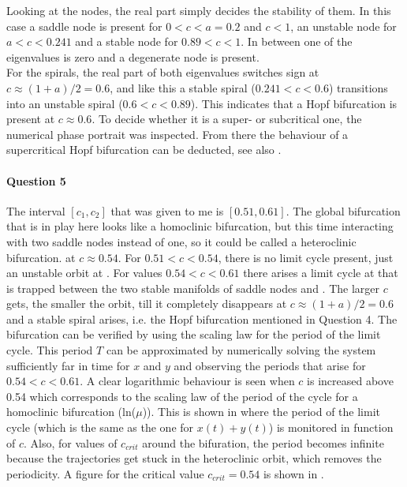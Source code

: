 \documentclass[a4paper,11pt]{article}
\begin{document}
Looking at the nodes, the real part simply decides the stability of them. In this case a saddle node is present for $0<c<a=0.2$ and $c<1$, an unstable node for 
$a<c<0.241$ and a stable node for $0.89<c<1$. In between one of the eigenvalues is zero and a degenerate node is present.\\
For the spirals, the real part of both eigenvalues switches sign at $c\approx(1+a)/2=0.6$, and like this a stable spiral ($0.241<c<0.6$) transitions into an 
unstable spiral ($0.6<c<0.89$). 
This indicates that a Hopf bifurcation is present at $c\approx0.6$. To decide whether it is a super- or subcritical one, 
the numerical phase portrait was inspected. From there the behaviour of a supercritical Hopf bifurcation can be deducted, see also .

\paragraph{Question 5}\; The interval $[c_1,c_2]$ that was given to me is $[0.51,0.61]$. The global bifurcation that is in play here looks like a homoclinic bifurcation,
but this time interacting with two saddle nodes instead of one, so it could be called a heteroclinic bifurcation.
at $c\approx0.54$. For $0.51<c<0.54$, there is no limit cycle present, just an unstable orbit at . For values $0.54<c<0.61$ there arises a limit cycle at 
that is trapped between the two stable manifolds of saddle nodes  and . The larger $c$ gets, the smaller the orbit, till it completely disappears
at $c\approx(1+a)/2=0.6$ and a stable spiral arises, i.e. the Hopf bifurcation mentioned in Question 4.
The bifurcation can be verified by using the scaling law for the period of the limit cycle. This period $T$ can be approximated by numerically solving the system
sufficiently far in time for $x$ and $y$ and observing the periods that arise for $0.54<c<0.61$. A clear logarithmic behaviour is seen when $c$ is increased above 0.54 which
corresponds to the scaling law of the period of the cycle for a homoclinic bifurcation (ln($\mu$)). This is shown in  where the period of the limit cycle (which
is the same as the one for $x(t)+y(t)$) is monitored in function of $c$.
Also, for values of $c_{crit}$ around the bifuration, the period becomes infinite because the trajectories get stuck in the heteroclinic orbit, which removes the periodicity.
A figure for the critical value $c_{crit}=0.54$ is shown in .
\end{document}
